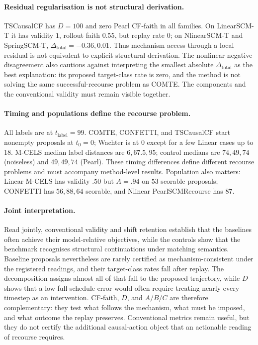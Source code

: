 \documentclass{article}
\newcommand{\dototal}{\Delta_{\mathrm{total}}}
\begin{document}
\paragraph{Residual regularisation is not structural derivation.}
\label{sec:res-foil}

TSCausalCF has $D=100$ and zero Pearl CF-faith in all families.  On LinearSCM-T it has validity $1$, rollout faith $0.55$, but replay rate $0$; on NlinearSCM-T and SpringSCM-T, $\dototal=-0.36,0.01$.  Thus mechanism access through a local residual is not equivalent to explicit structural derivation.  The nonlinear negative disagreement also cautions against interpreting the smallest absolute $\dototal$ as the best explanation: its proposed target-class rate is zero, and the method is not solving the same successful-recourse problem as COMTE. The components and the conventional validity must remain visible together.

\paragraph{Timing and populations define the recourse problem.}
\label{sec:res-horizon}

All labels are at $t_{\mathrm{label}}=99$.  COMTE, CONFETTI, and TSCausalCF start nonempty proposals at $t_0=0$; Wachter is at $0$ except for a few Linear cases up to $18$.  M-CELS median label distances are $6,67.5,95$; control medians are $74,49,74$ (noiseless) and $49,49,74$ (Pearl).  These timing differences define different recourse problems and must accompany method-level results. Population also matters: Linear M-CELS has validity $.50$ but $A=.94$ on $53$ scorable proposals; CONFETTI has $56,88,64$ scorable, and Nlinear PearlSCMRecourse has $87$.

\paragraph{Joint interpretation.}
Read jointly, conventional validity and shift retention establish that the baselines often achieve their model-relative objectives, while the controls show that the benchmark recognises structural continuations under matching semantics. Baseline proposals nevertheless are rarely certified as mechanism-consistent under the registered readings, and their target-class rates fall after replay. The decomposition assigns almost all of that fall to the proposed trajectory, while $D$ shows that a low full-schedule error would often require treating nearly every timestep as an intervention. CF-faith, $D$, and $A/B/C$ are therefore complementary: they test what follows the mechanism, what must be imposed, and what outcome the replay preserves. Conventional metrics remain useful, but they do not certify the additional causal-action object that an actionable reading of recourse requires.
\end{document}
